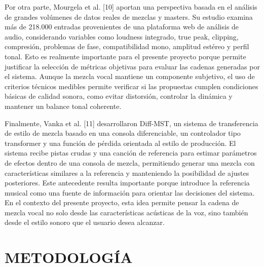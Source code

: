 \documentclass[12pt]{article}
\begin{document}
Por otra parte, Mourgela et al. [10] aportan una perspectiva basada en el análisis de grandes volúmenes de datos reales de mezclas y masters. Su estudio examina más de 218.000 entradas provenientes de una plataforma web de análisis de audio, considerando variables como loudness integrado, true peak, clipping, compresión, problemas de fase, compatibilidad mono, amplitud estéreo y perfil tonal. Esto es realmente importante para el presente proyecto porque permite justificar la selección de métricas objetivas para evaluar las cadenas generadas por el sistema. Aunque la mezcla vocal mantiene un componente subjetivo, el uso de criterios técnicos medibles permite verificar si las propuestas cumplen condiciones básicas de calidad sonora, como evitar distorsión, controlar la dinámica y mantener un balance tonal coherente.

Finalmente, Vanka et al. [11] desarrollaron Diff-MST, un sistema de transferencia de estilo de mezcla basado en una consola diferenciable, un controlador tipo transformer y una función de pérdida orientada al estilo de producción. El sistema recibe pistas crudas y una canción de referencia para estimar parámetros de efectos dentro de una consola de mezcla, permitiendo generar una mezcla con características similares a la referencia y manteniendo la posibilidad de ajustes posteriores. Este antecedente resulta importante porque introduce la referencia musical como una fuente de información para orientar las decisiones del sistema. En el contexto del presente proyecto, esta idea permite pensar la cadena de mezcla vocal no solo desde las características acústicas de la voz, sino también desde el estilo sonoro que el usuario desea alcanzar.

\section{METODOLOGÍA}
\end{document}
